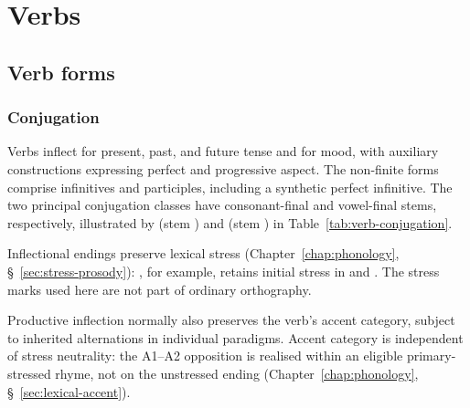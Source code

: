 \chapter{Verbs}
\label{chap:verbs}

\section{Verb forms}

\subsection{Conjugation}
\label{sec:verb-conjugation}

Verbs inflect for present, past, and future tense and for mood, with auxiliary constructions expressing perfect and progressive aspect. The non-finite forms comprise infinitives and participles, including a synthetic perfect infinitive. The two principal conjugation classes have consonant-final and vowel-final stems, respectively, illustrated by  (stem ) and  (stem ) in Table~\ref{tab:verb-conjugation}.

Inflectional endings preserve lexical stress (Chapter~\ref{chap:phonology}, \S~\ref{sec:stress-prosody}): , for example, retains initial stress in  and . The stress marks used here are not part of ordinary orthography.

Productive inflection normally also preserves the verb's accent category, subject to inherited alternations in individual paradigms. Accent category is independent of stress neutrality: the A1--A2 opposition is realised within an eligible primary-stressed rhyme, not on the unstressed ending (Chapter~\ref{chap:phonology}, \S~\ref{sec:lexical-accent}).

